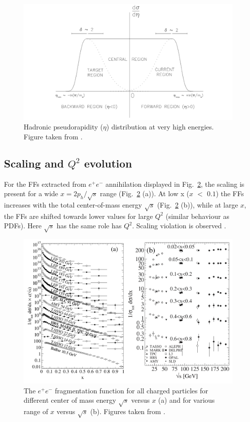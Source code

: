 \begin{figure}[!h]
  \centering
	\includegraphics[scale=0.5]{./gfx/Berger.png}
	\caption{Hadronic pseudorapidity ($\eta$) distribution at very high energies. Figure taken from \cite{Niczy}.}
	\label{pic:Berger}
\end{figure}

\subsection{Scaling and $Q^2$ evolution}

For the FFs extracted from $e^+e^-$ annihilation displayed in Fig.~\ref{pic:FFscale}, the scaling is present for a wide $x = 2p_h/\sqrt{s}$ range (Fig.~\ref{pic:FFscale} (a)). At low x ($x$ $<$ $0.1$) the FFs increases with the total center-of-mass energy $\sqrt{s}$ (Fig.~\ref{pic:FFscale} (b)), while at large $x$, the FFs are shifted towards lower values for large $Q^2$ (similar behaviour as PDFs). Here $\sqrt{s}$ has the same role has $Q^2$. Scaling violation is observed \cite{PDG}.

\begin{figure}[!h]
  \centering
	\includegraphics[scale=0.6]{./gfx/FFscale.png}
	\caption{The $e^+ e^-$ fragmentation function for all charged particles for different center of mass energy $\sqrt{s}$ versus $x$ (a) and for various range of $x$ versus $\sqrt{s}$ (b). Figures taken from \cite{PDG}.}
	\label{pic:FFscale}
\end{figure}

